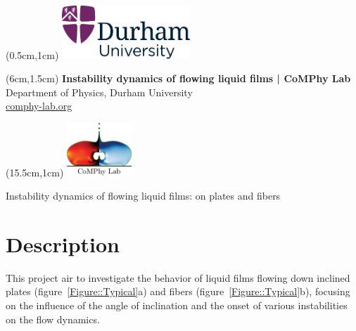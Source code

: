 \documentclass[11pt]{article}
\newlength{\headertobodysep}
\begin{document}
\thispagestyle{empty}

\textblockorigin{0pt}{0pt}

\begin{textblock*}{5cm}(0.5cm,1cm)
    \includegraphics[height=2cm]{../_logosAndRef/Durham-University.pdf}
\end{textblock*}

\begin{textblock*}{9cm}(6cm,1.5cm)
    \centering
    {\large \textbf{Instability dynamics of flowing liquid films | CoMPhy Lab}}\\[0.2em]
    Department of Physics, Durham University\\[0.3em]
    \href{https://comphy-lab.org}{comphy-lab.org}
\end{textblock*}

\begin{textblock*}{5cm}(15.5cm,1cm) %
    \includegraphics[height=2cm]{../_logosAndRef/CoMPhy-Lab.png}
\end{textblock*}

\vspace*{\headertobodysep}

\begin{center}
    \begin{LARGE}
     Instability dynamics of flowing liquid films: on plates and fibers
    \end{LARGE}
\end{center}

\section*{Description}

This project air to investigate the behavior of liquid films flowing down inclined plates (figure~\ref{Figure::Typical}a) and fibers  (figure~\ref{Figure::Typical}b), focusing on the influence of the angle of inclination and the onset of various instabilities on the flow dynamics.
\end{document}
